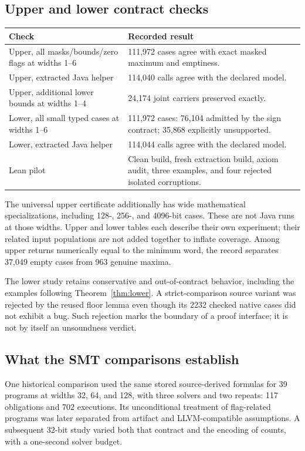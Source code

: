 \subsection{Upper and lower contract checks}
\begin{center}\small
\begin{tabularx}{\textwidth}{@{}lX@{}}
\toprule
Check & Recorded result\\
\midrule
Upper, all masks/bounds/zero flags at widths 1--6 & 111,972 cases agree with exact masked maximum and emptiness.\\
Upper, extracted Java helper & 114,040 calls agree with the declared model.\\
Upper, additional lower bounds at widths 1--4 & 24,174 joint carriers preserved exactly.\\
Lower, all small typed cases at widths 1--6 & 111,972 cases: 76,104 admitted by the sign contract; 35,868 explicitly unsupported.\\
Lower, extracted Java helper & 114,044 calls agree with the declared model.\\
Lean pilot & Clean build, fresh extraction build, axiom audit, three examples, and four rejected isolated corruptions.\\
\bottomrule
\end{tabularx}
\end{center}

The universal upper certificate additionally has wide mathematical specializations, including 128-, 256-, and 4096-bit cases. These are not Java runs at those widths. Upper and lower tables each describe their own experiment; their related input populations are not added together to inflate coverage. Among upper returns numerically equal to the minimum word, the record separates 37,049 empty cases from 963 genuine maxima.

The lower study retains conservative and out-of-contract behavior, including the examples following Theorem~\ref{thm:lower}. A strict-comparison source variant was rejected by the reused floor lemma even though its 2232 checked native cases did not exhibit a bug. Such rejection marks the boundary of a proof interface; it is not by itself an unsoundness verdict.

\subsection{What the SMT comparisons establish}
One historical comparison used the same stored source-derived formulas for 39 programs at widths 32, 64, and 128, with three solvers and two repeats: 117 obligations and 702 executions. Its unconditional treatment of flag-related programs was later separated from artifact and LLVM-compatible assumptions. A subsequent 32-bit study varied both that contract and the encoding of counts, with a one-second solver budget.

